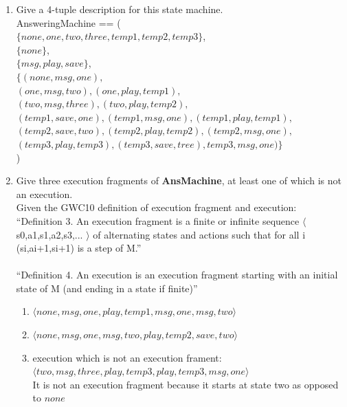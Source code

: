\documentclass{article}
\begin{document}
\begin{enumerate}
\begin{enumerate}
 \item Give a 4-tuple description for this state machine. \\
   AnsweringMachine == ( \\
   $\{none,one,two,three,temp1,temp2,temp3 \}$, \\
   $\{none \}$, \\
   $\{msg, play, save \}$, \\
   $\{(none, msg, one),$ \\
   $ (one, msg, two), (one, play, temp1),$ \\
   $ (two, msg, three),(two, play, temp2),$ \\
   $ (temp1, save, one), (temp1, msg, one), (temp1, play, temp1), $ \\
   $ (temp2, save, two), (temp2, play, temp2), (temp2, msg, one),$ \\
   $ (temp3, play, temp3), (temp3, save, tree), temp3, msg, one) \}$ \\
   ) \\
 \item Give three execution fragments of {\bf AnsMachine}, at least one of which is not an
   execution. \\
   Given the GWC10 definition of execution fragment and execution: \\
   ``Definition 3. An execution fragment is a finite or infinite sequence $\langle$ s0,a1,s1,a2,s3,... $\rangle$ of alternating states and actions such that for all i (si,ai+1,si+1) is a step of M.''\\
   \\
   ``Definition 4. An execution is an execution fragment starting with an initial state of M (and ending in a state if finite)'' \\
   \begin{enumerate}
   \item $\langle none, msg, one, play, temp1, msg, one, msg, two \rangle$
   \item $\langle none, msg, one, msg, two, play, temp2, save, two\rangle$
   \item execution which is not an execution frament: \\ $\langle two, msg, three, play, temp3, play, temp3, msg, one \rangle$ \\
     It is not an execution fragment because it starts at state two as opposed to $none$ \\
   \end{enumerate}
 

\end{enumerate}
\end{enumerate}
\end{document}
